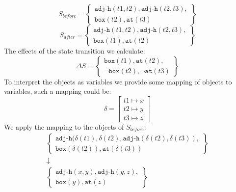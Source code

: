 \documentclass[../Master.tex]{subfiles}
\begin{document}
\begin{thm-sokoban-example-initial-precond}
\begin{equation*}\label{eq:s_before}
S_{before} =
	\left\{
		\begin{gathered}
			\texttt{adj-h}(t1, t2), \texttt{adj-h}(t2, t3), \\
			\texttt{box}(t2), \texttt{at}(t3)
		\end{gathered}
	\right\}
\end{equation*}
\begin{equation*}
S_{after} =
	\left\{
		\begin{gathered}
			\texttt{adj-h}(t1, t2), \texttt{adj-h}(t2, t3), \\
			\texttt{box}(t1), \texttt{at}(t2)
		\end{gathered}
	\right\}
\end{equation*}
The effects of the state transition we calculate:
\begin{equation*}
\Delta S =
	\left\{
		\begin{gathered}
			\texttt{box}(t1), \texttt{at}(t2), \\
			\neg\texttt{box}(t2), \neg\texttt{at}(t3)
		\end{gathered}
	\right\}
\end{equation*}
To interpret the objects as variables we provide some mapping of objects to variables, such a mapping could be:
\begin{equation*}
\delta =
	\left [
		\begin{gathered}
			t1 \mapsto x \\
			t2 \mapsto y \\
			t3 \mapsto z
		\end{gathered}
	\right ]
\end{equation*}
We apply the mapping to the objects of $S_{before}$:
\begin{equation*}
	\begin{gathered}
		\left\{
			\begin{gathered}
				\texttt{adj-h}(\delta (t1), \delta (t2), \texttt{adj-h}(\delta (t2), \delta (t3)), \\
				\texttt{box}(\delta (t2)), \texttt{at}(\delta (t3))
			\end{gathered}
		\right\} \\
		\downarrow \\
		\left\{
			\begin{gathered}
				\texttt{adj-h}(x, y), \texttt{adj-h}(y, z), \\
				\texttt{box}(y), \texttt{at}(z)
			\end{gathered}
		\right\}

\end{gathered}
\end{equation*}
\end{thm-sokoban-example-initial-precond}
\end{document}
